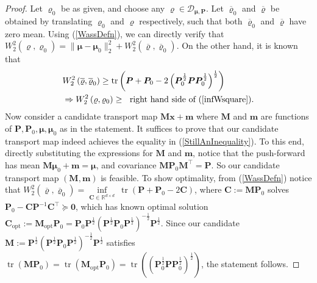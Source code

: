 \documentclass[letterpaper,10pt,twocolumn,conference]{ieeeconf}
\newcommand{\cD}{{\mathscr{D}}}
\newcommand{\tr}{\operatorname{tr}}
\begin{document}
\begin{proof}
Let $\varrho_{0}$ be as given, and choose any $\varrho\in\cD_{\bm{\mu},\bm{P}}$. Let $\overline{\varrho}_{0}$ and $\overline{\varrho}$ be obtained by translating $\varrho_{0}$ and $\varrho$ respectively, such that both $\overline{\varrho}_{0}$ and $\overline{\varrho}$ have zero mean. Using (\ref{WassDefn}), we can directly verify \cite[p. 236]{GivensShortt1984} that $W_{2}^{2}\left(\varrho,\varrho_{0}\right) = \parallel\bm{\mu}-\bm{\mu}_{0}\parallel_{2}^{2} + W_{2}^{2}\left(\overline{\varrho},\overline{\varrho}_{0}\right)$. On the other hand, it is known \cite[p. 11, Proposition 1.1.6]{RachevRuschendorfBook1998} that 
\begin{align}
&W_{2}^{2}\left(\overline{\varrho},\overline{\varrho}_{0}\right) \geq \tr\left(\bm{P} + \bm{P}_{0} - 2 \left(\bm{P}_{0}^{\frac{1}{2}} \bm{P} \bm{P}_{0}^{\frac{1}{2}}\right)^{\frac{1}{2}}\right) \nonumber\\
&\Rightarrow W_{2}^{2}\left(\varrho,\varrho_{0}\right) \geq \;\text{ right hand side of (\ref{infWsquare})}.
\label{StillAnInequality}	
\end{align}
Now consider a candidate transport map $\bm{M}\bm{x} + \bm{m}$ where $\bm{M}$ and $\bm{m}$ are functions of $\bm{P},\bm{P}_{0},\bm{\mu},\bm{\mu}_{0}$ as in the statement. It suffices to prove that our candidate transport map indeed achieves the equality in (\ref{StillAnInequality}). To this end, directly substituting the expressions for $\bm{M}$ and $\bm{m}$, notice that the push-forward has mean $\bm{M}\bm{\mu}_{0} + \bm{m} = \bm{\mu}$, and covariance $\bm{M}\bm{P}_{0}\bm{M}^{\top} = \bm{P}$. So our candidate transport map $(\bm{M},\bm{m})$ is feasible. To show optimality, from (\ref{WassDefn}) notice that $W_{2}^{2}\left(\overline{\varrho},\overline{\varrho}_{0}\right) = \underset{\bm{C}\in\mathbb{R}^{d\times d}}{\inf}\:\tr(\bm{P}+\bm{P}_{0} - 2\bm{C})$, where $\bm{C}:=\bm{M}\bm{P}_{0}$ solves $\bm{P}_{0} - \bm{C}\bm{P}^{-1}\bm{C}^{\top} \succeq \bm{0}$, which has known optimal solution $\bm{C}_{\mathrm{opt}}:=\bm{M}_{\mathrm{opt}}\bm{P}_{0}=\bm{P}_{0}\bm{P}^{\frac{1}{2}} \left(\bm{P}^{\frac{1}{2}}\bm{P}_{0}\bm{P}^{\frac{1}{2}}\right)^{-\frac{1}{2}} \bm{P}^{\frac{1}{2}}$. Since our candidate $\bm{M}:=\bm{P}^{\frac{1}{2}} \left(\bm{P}^{\frac{1}{2}}\bm{P}_{0}\bm{P}^{\frac{1}{2}}\right)^{-\frac{1}{2}} \bm{P}^{\frac{1}{2}}$ satisfies $\tr\left(\bm{M}\bm{P}_{0}\right) = \tr\left(\bm{M}_{\mathrm{opt}}\bm{P}_{0}\right) = \tr\left(\left(\bm{P}_{0}^{\frac{1}{2}} \bm{P} \bm{P}_{0}^{\frac{1}{2}}\right)^{\frac{1}{2}}\right)$, the statement follows.
\end{proof}
\end{document}
